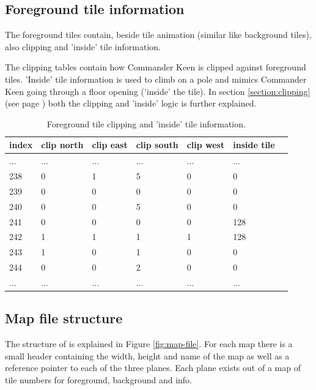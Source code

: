\documentclass[book.tex]{subfiles}
\begin{document}
\subsection{Foreground tile information}
\label{section:foreground_tile_info}
The foreground tiles contain, beside tile animation (similar like background tiles), also clipping and 'inside' tile information.\\
\par
The clipping tables contain how Commander Keen is clipped against foreground tiles. 'Inside' tile information is used to climb on a pole and mimics Commander Keen going through a floor opening ('inside' the tile). In section \ref{section:clipping} (see page \pageref{section:clipping}) both the clipping and 'inside' logic is further explained.\\
\begin{table}[H]
  \begin{tabularx}{\textwidth}[c]{XXXXXXX}
  \hline
  \textbf{index} & \textbf{clip north} & \textbf{clip east} & \textbf{clip south} & \textbf{clip west}  & \textbf{inside tile} \\ \hline
  ...    & ...     & ...    & ...   & ...     & ...      \\
  238    & 0       & 1      & 5     & 0       & 0        \\
  239    & 0       & 0      & 0     & 0       & 0        \\
  240    & 0       & 0      & 5     & 0       & 0        \\
  241    & 0       & 0      & 0     & 0       & 128       \\
  242    & 1       & 1      & 1     & 1       & 128       \\
  243    & 1       & 0      & 1     & 0       & 0       \\
  244    & 0       & 0      & 2     & 0       & 0       \\
  ...    & ...     & ...    & ...   & ...     & ...     \\
  \end{tabularx}
  \caption{Foreground tile clipping and 'inside' tile information.}
  \end{table}


\pagebreak
 
\subsection{Map file structure}
The structure of  is explained in Figure \ref{fig:map-file}. For each map there is a small header containing the width, height and name of the map as well as a reference pointer to each of the three planes. Each plane exists out of a map of tile numbers for foreground, background and info.\\
\end{document}
